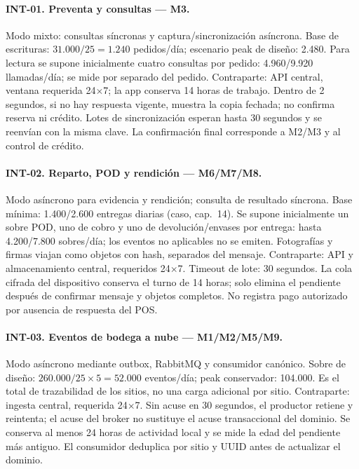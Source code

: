 \paragraph{INT-01. Preventa y consultas --- M3.}
Modo mixto: consultas síncronas y captura/sincronización asíncrona. Base de escrituras: $31.000/25=1.240$ pedidos/día; escenario peak de diseño: 2.480. Para lectura se supone inicialmente cuatro consultas por pedido: 4.960/9.920 llamadas/día; se mide por separado del pedido. Contraparte: API central, ventana requerida 24$\times$7; la app conserva 14 horas de trabajo. Dentro de 2 segundos, si no hay respuesta vigente, muestra la copia fechada; no confirma reserva ni crédito. Lotes de sincronización esperan hasta 30 segundos y se reenvían con la misma clave. La confirmación final corresponde a M2/M3 y al control de crédito.

\paragraph{INT-02. Reparto, POD y rendición --- M6/M7/M8.}
Modo asíncrono para evidencia y rendición; consulta de resultado síncrona. Base mínima: 1.400/2.600 entregas diarias (caso, cap.~14). Se supone inicialmente un sobre POD, uno de cobro y uno de devolución/envases por entrega: hasta 4.200/7.800 sobres/día; los eventos no aplicables no se emiten. Fotografías y firmas viajan como objetos con hash, separados del mensaje. Contraparte: API y almacenamiento central, requeridos 24$\times$7. Timeout de lote: 30 segundos. La cola cifrada del dispositivo conserva el turno de 14 horas; solo elimina el pendiente después de confirmar mensaje y objetos completos. No registra pago autorizado por ausencia de respuesta del POS.

\paragraph{INT-03. Eventos de bodega a nube --- M1/M2/M5/M9.}
Modo asíncrono mediante outbox, RabbitMQ y consumidor canónico. Sobre de diseño: $260.000/25\times5=52.000$ eventos/día; peak conservador: 104.000. Es el total de trazabilidad de los sitios, no una carga adicional por sitio. Contraparte: ingesta central, requerida 24$\times$7. Sin acuse en 30 segundos, el productor retiene y reintenta; el acuse del broker no sustituye el acuse transaccional del dominio. Se conserva al menos 24 horas de actividad local y se mide la edad del pendiente más antiguo. El consumidor deduplica por sitio y UUID antes de actualizar el dominio.

